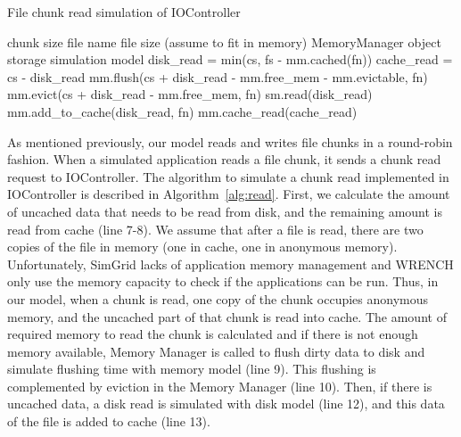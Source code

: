 \documentclass[conference]{IEEEtran}
\newcommand{\Desc}[2]{\State \makebox[2em][l]{#1}#2}
\begin{document}
    \begin{algorithm}\caption{File chunk read simulation of IOController}
    \label{alg:read}
        \small
        \begin{algorithmic}[1]
            \Input
                \Desc{cs}{chunk size}
                \Desc{fn}{file name}
                \Desc{fs}{file size (assume to fit in memory)}
                \Desc{mm}{MemoryManager object}
                \Desc{sm}{storage simulation model}
               \EndInput
               \State disk\_read = min(cs, fs - mm.cached(fn))
               \State cache\_read = cs - disk\_read
            \State mm.flush(cs + disk\_read - mm.free\_mem - mm.evictable, fn) 
            \State mm.evict(cs + disk\_read - mm.free\_mem, fn) 
                  
                \State sm.read(disk\_read)  
                \State mm.add\_to\_cache(disk\_read, fn)     
            \EndIf
             
                \State mm.cache\_read(cache\_read)  
            \EndIf
        \end{algorithmic}
    \end{algorithm}            
    As mentioned previously, our model reads and writes file chunks in a round-robin 
    fashion.
    When a simulated application reads a file chunk, it sends a chunk read request 
    to IOController.             
    The algorithm to simulate a chunk read implemented in IOController 
    is described in Algorithm~\ref{alg:read}.   
    First, we calculate the amount of uncached data that needs to be read 
    from disk, and the remaining amount is read from cache (line 7-8).
    We assume that after a file is read, there are two copies of the file in memory 
    (one in cache, one in anonymous memory). 
    Unfortunately, SimGrid lacks of application memory management and WRENCH 
    only use the memory capacity to check if the applications can be run. 
    Thus, in our model, when a chunk is read, one copy of the chunk 
    occupies anonymous memory, and the uncached part of that chunk is 
    read into cache.    
    The amount of required memory to read the chunk is calculated and 
    if there is not enough memory available, Memory Manager is called to 
    flush dirty data to disk and simulate flushing time with memory model (line 9). 
    This flushing is complemented by eviction in the Memory Manager (line 10). 
    Then, if there is uncached data, a disk read is simulated with disk model (line 12), 
    and this data of the file is added to cache (line 13).
\end{document}
